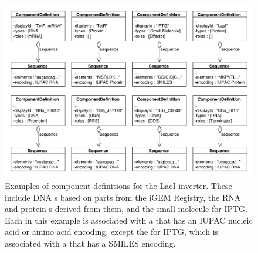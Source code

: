 \begin{figure}[ht]
\begin{center}
\includegraphics[width=\textwidth]{example_uml/toggle_1}
\caption[]{Examples of component definitions for the LacI inverter. These include DNA s based on parts from the iGEM Registry, the RNA and protein s derived from them, and the small molecule  for IPTG. Each  in this example is associated with a  that has an IUPAC nucleic acid or amino acid encoding, except the  for IPTG, which is associated with a  that has a SMILES encoding.}
\label{uml:ex_comp_defs}
\end{center}
\end{figure}

